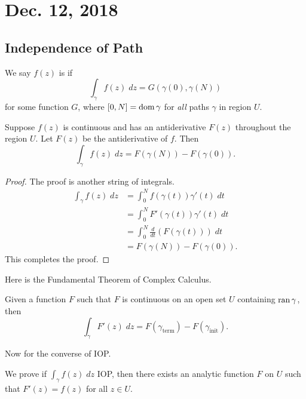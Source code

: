 \documentclass[notes]{subfile}
\begin{document}
\section{Dec. 12, 2018}

\subsection{Independence of Path}

We say $f(z)$ is  if
\[ \int_{\gamma} f(z) \; dz = G(\gamma(0), \gamma(N)) \]
for some function $G$, where $[0,N] = \operatorname{dom}{\gamma}$ for 
\textit{all} paths $\gamma$ in region $U$.

\begin{theorem}
    Suppose $f(z)$ is continuous and has an antiderivative $F(z)$ throughout the region $U$.
    Let $F(z)$ be the antiderivative of $f$.
    Then
    \[ \int_{\gamma} f(z) \; dz = F(\gamma(N)) - F(\gamma(0)). \]
\end{theorem}

\begin{proof}
    The proof is another string of integrals.
    \begin{align*}
        \int_{\gamma} f(z) \; dz &= \int_0^N f(\gamma(t)) \gamma'(t) \; dt \\
        &= \int_0^N F'(\gamma(t)) \gamma'(t) \; dt \\
        &= \int_0^N \frac{d}{dt} (F(\gamma(t))) \; dt \\
        &= F(\gamma(N)) - F(\gamma(0)).
    \end{align*}
    This completes the proof.
\end{proof}

Here is the Fundamental Theorem of Complex Calculus.
\begin{theorem}
    Given a function $F$ such that $F$ is continuous on an open
    set $U$ containing $\operatorname{ran}{\gamma}$, then
    \[ \int_{\gamma} F'(z) \; dz = F(\gamma_{\text{term}}) -
    F(\gamma_{\text{init}}). \]
\end{theorem}

Now for the converse of IOP.
\begin{theorem}
    We prove if $\int_{\gamma} f(z) \; dz$ IOP, then there exists
    an analytic function $F$ on $U$ such that $F'(z) = f(z)$ for
    all $z \in U$.
\end{theorem}
\end{document}
